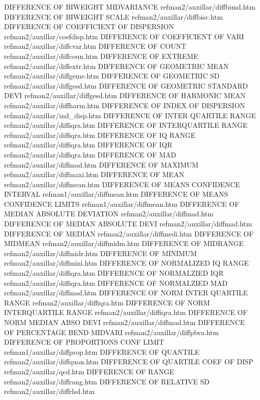 DIFFERENCE OF BIWEIGHT MIDVARIANCE      refman2/auxillar/diffbimd.htm
DIFFERENCE OF BIWEIGHT SCALE            refman2/auxillar/diffbisc.htm
DIFFERENCE OF COEFFICIENT OF DISPERSION refman2/auxillar/coefdisp.htm
DIFFERENCE OF COEFFICIENT OF VARI       refman2/auxillar/diffcvar.htm
DIFFERENCE OF COUNT                     refman2/auxillar/diffcoun.htm
DIFFERENCE OF EXTREME                   refman2/auxillar/diffextr.htm
DIFFERENCE OF GEOMETRIC MEAN            refman2/auxillar/diffgeme.htm
DIFFERENCE OF GEOMETRIC SD              refman2/auxillar/diffgesd.htm
DIFFERENCE OF GEOMETRIC STANDARD DEVI   refman2/auxillar/diffgesd.htm
DIFFERENCE OF HARMONIC MEAN             refman2/auxillar/diffharm.htm
DIFFERENCE OF INDEX OF DISPERSION       refman2/auxillar/ind_disp.htm
DIFFERENCE OF INTER QUARTILE RANGE      refman2/auxillar/diffiqra.htm
DIFFERENCE OF INTERQUARTILE RANGE       refman2/auxillar/diffiqra.htm
DIFFERENCE OF IQ RANGE                  refman2/auxillar/diffiqra.htm
DIFFERENCE OF IQR                       refman2/auxillar/diffiqra.htm
DIFFERENCE OF MAD                       refman2/auxillar/diffmad.htm
DIFFERENCE OF MAXIMUM                   refman2/auxillar/diffmaxi.htm
DIFFERENCE OF MEAN                      refman2/auxillar/diffmean.htm
DIFFERENCE OF MEANS CONFIDENCE INTERVAL refman1/auxillar/diffmean.htm
DIFFERENCE OF MEANS CONFIDENCE LIMITS   refman1/auxillar/diffmean.htm
DIFFERENCE OF MEDIAN ABSOLUTE DEVIATION refman2/auxillar/diffmad.htm
DIFFERENCE OF MEDIAN ABSOLUTE DEVI      refman2/auxillar/diffmad.htm
DIFFERENCE OF MEDIAN                    refman2/auxillar/diffmedi.htm
DIFFERENCE OF MIDMEAN                   refman2/auxillar/diffmidm.htm
DIFFERENCE OF MIDRANGE                  refman2/auxillar/diffmidr.htm
DIFFERENCE OF MINIMUM                   refman2/auxillar/diffmini.htm
DIFFERENCE OF NORMALIZED IQ RANGE       refman2/auxillar/diffiqra.htm
DIFFERENCE OF NORMALZIED IQR            refman2/auxillar/diffiqra.htm
DIFFERENCE OF NORMALZIED MAD            refman2/auxillar/diffmad.htm
DIFFERENCE OF NORM INTER QUARTILE RANGE refman2/auxillar/diffiqra.htm
DIFFERENCE OF NORM INTERQUARTILE RANGE  refman2/auxillar/diffiqra.htm
DIFFERENCE OF NORM MEDIAN ABSO DEVI     refman2/auxillar/diffmad.htm
DIFFERENCE OF PERCENTAGE BEND MIDVARI   refman2/auxillar/diffpbva.htm
DIFFERENCE OF PROPORTIONS CONF LIMIT    refman1/auxillar/diffprop.htm
DIFFERENCE OF QUANTILE                  refman2/auxillar/diffquan.htm
DIFFERENCE OF QUARTILE COEF OF DISP     refman2/auxillar/qcd.htm
DIFFERENCE OF RANGE                     refman2/auxillar/diffrang.htm
DIFFERENCE OF RELATIVE SD               refman2/auxillar/diffrlsd.htm
